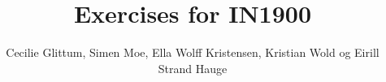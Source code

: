 %
%
%
\documentclass[a4paper, english]{report}

\usepackage{style}
\usepackage{ifikompendiumforside}

%

\newcommand{\py}[1]{\pythoninline{#1}}

\title{Exercises for IN1900}
\author{Cecilie Glittum, Simen Moe, Ella Wolff Kristensen, \newline Kristian Wold og Eirill Strand Hauge}


\ififorside


\chapter*{Preface}


\chapter{Computing with Formulas}

\chapter{Loops and Lists}

\chapter{Functions and Branching }

\chapter{User Input and Error Handling}

\chapter{Array Computing and Curve Plotting}

\chapter{Dictionaries and Strings}

\chapter{Introduction to Classes}

